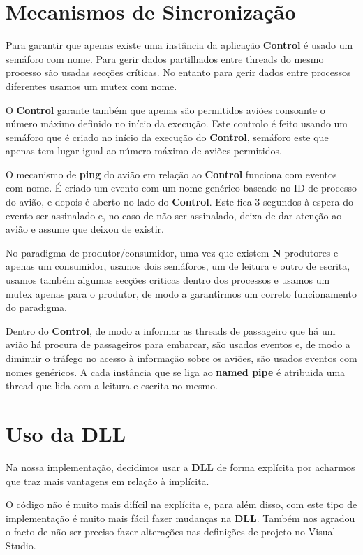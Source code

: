 \documentclass[11pt]{article}
\begin{document}
	
	\large
	\section{Mecanismos de Sincronização}
	\normalsize
	
	Para garantir que apenas existe uma instância da aplicação \textbf{Control} é usado um semáforo com nome. Para gerir dados partilhados entre threads do mesmo processo são usadas secções críticas. No entanto para gerir dados entre processos diferentes usamos um mutex com nome.
	
	O \textbf{Control} garante também que apenas são permitidos aviões consoante o número máximo definido no início da execução. Este controlo é feito usando um semáforo que é criado no início da execução do \textbf{Control}, semáforo este que apenas tem lugar igual ao número máximo de aviões permitidos.
	
	O mecanismo de \textbf{ping} do avião em relação ao \textbf{Control} funciona com eventos com nome. É criado um evento com um nome genérico baseado no ID de processo do avião, e depois é aberto no lado do \textbf{Control}. Este fica 3 segundos à espera do evento ser assinalado e, no caso de não ser assinalado, deixa de dar atenção ao avião e assume que deixou de existir.
	
	No paradigma de produtor/consumidor, uma vez que existem \textbf{N} produtores e apenas um consumidor, usamos dois semáforos, um de leitura e outro de escrita, usamos também algumas secções criticas dentro dos processos e usamos um mutex apenas para o produtor, de modo a garantirmos um correto funcionamento do paradigma.
	
	Dentro do \textbf{Control}, de modo a informar as threads de passageiro que há um avião há procura de passageiros para embarcar, são usados eventos e, de modo a diminuir o tráfego no acesso à informação sobre os aviões, são usados eventos com nomes genéricos. A cada instância que se liga ao \textbf{named pipe} é atribuida uma thread que lida com a leitura e escrita no mesmo.
	
	
	\large
	\section{Uso da DLL}
	\normalsize
	
	Na nossa implementação, decidimos usar a \textbf{DLL} de forma explícita por acharmos que traz mais vantagens em relação à implícita.
	
	O código não é muito mais difícil na explícita e, para além disso, com este tipo de implementação é muito mais fácil fazer mudanças na \textbf{DLL}. Também nos agradou o facto de não ser preciso fazer alterações nas definições de projeto no Visual Studio.
	
\end{document}
